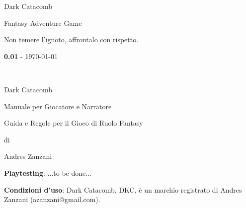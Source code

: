 \documentclass[12pt,a4paper,twoside,openany]{book}
\begin{document}
	
\def \versione {0.01}
\thispagestyle{empty}
 
{\Huge \begin{center}
		Dark Catacomb
\end{center}}

\vfill
\begin{center}
	\Large{\color{black} Fantasy Adventure Game}
\end{center}

\pagebreak

	
\bigskip
Non temere l'ignoto, affrontalo con rispetto.
	
	\vspace{\fill}
\begin{center}\textbf{\versione} - \today\end{center}
\thispagestyle{empty}


\newpage~\thispagestyle{empty}%


\newcommand{\riga}{\rule{\textwidth}{0.4pt}}


{\Huge \begin{center} Dark Catacomb\end{center}}

\bigskip

\begin{center}{\LARGE Manuale per Giocatore e Narratore}\\ \end{center}

{\large \begin{center} Guida e Regole per il Gioco di Ruolo Fantasy \end{center}}

\begin{center}di \end{center}

{\LARGE \begin{center} Andres Zanzani \end{center}}

\vspace{2cm}


\vfill

\begin{mdframed}[roundcorner=10pt]

\medskip

\textbf{Playtesting}: ...to be done...

\bigskip

\begin{flushleft}\textbf{Condizioni d'uso}: Dark Catacomb, DKC, è un marchio registrato di Andres Zanzani (azanzani@gmail.com).
\end{flushleft}

\vspace{0.5cm}


\medskip

\end{mdframed}
\end{document}
